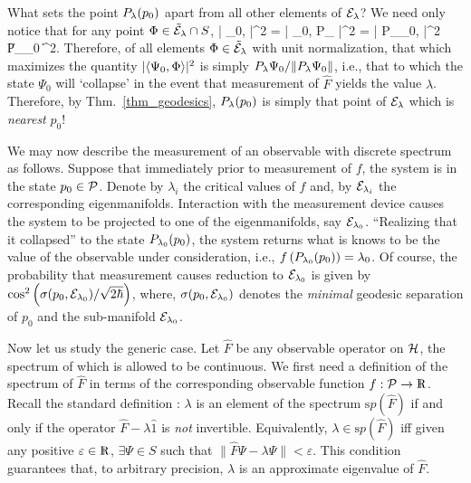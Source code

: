 What sets the point ${\Bbb P}_\lambda(p_0)$ apart from all other
elements of  ${\cal E}_\lambda$?  We need only notice that for any
point  $\Phi \in \tilde{\cal E}_\lambda \cap S$,
%
\be\label{projection-ineq}
\left| \< \Psi_0, \Phi \> \right|^2 =
\left| \< \Psi_0, {\Bbb P}_\lambda \Phi \> \right|^2 =
\left| \< {\Bbb P}_\lambda \Psi_0, \Phi \> \right|^2 \le
\| {\Bbb P}_\lambda \Psi_0 \|^2.
\ee
%
Therefore, of all elements $\Phi \in \tilde{\cal E}_\lambda$ with unit
normalization, that which maximizes the quantity $|\<
\Psi_0,\Phi\>|^2$ is simply ${\Bbb P}_\lambda \Psi_0 / \| {\Bbb
P}_\lambda \Psi_0 \|$, i.e., that to which the state $\Psi_0$ will
`collapse' in the event that measurement of $\hat{F}$ yields the value
$\lambda$.  Therefore, by Thm.~\ref{thm_geodesics}, ${\Bbb
P}_\lambda(p_0)$ is simply that point of ${\cal E}_\lambda$ which is
{\em nearest} $p_0$!

We may now describe the measurement of an observable with discrete
spectrum as follows.  Suppose that immediately prior to measurement of
$f$, the system is in the state $p_0 \in \P$.  Denote by $\lambda_i$
the critical values of $f$ and, by ${\cal E}_{\lambda_i}$ the
corresponding eigenmanifolds.  Interaction with the measurement device
causes the system to be projected to one of the eigenmanifolds, say
${\cal E}_{\lambda_0}$.  ``Realizing that it collapsed'' to the state
${\Bbb P}_{\lambda_0}(p_0)$, the system returns what is knows to be
the value of the observable under consideration, i.e., $f\left( {\Bbb
P}_{\lambda_0}(p_0)\right) = \lambda_0$.  Of course, the probability
that measurement causes reduction to ${\cal E}_{\lambda_0}$ is given
by $\cos^2 \left( \sigma(p_0,{\cal E}_{\lambda_0}) / \sqrt{2\hbar}
\right)$, where, $\sigma(p_0,{\cal E}_{\lambda_0})$ denotes the {\em
minimal} geodesic separation of $p_0$ and the sub-manifold ${\cal
E}_{\lambda_0}$.

Now let us study the generic case.  Let $\hat{F}$ be any observable
operator on $\H$, the spectrum of which is allowed to be continuous.
We first need a definition of the spectrum of $\hat{F}$ in terms of
the corresponding observable function $f:\P\rightarrow\R$.  Recall the
standard definition \cite{reed-simon}: $\lambda$ is an element of the
spectrum ${\mathrm sp}(\hat{F})$ if and only if the operator $\hat{F}
- \lambda\hat{1}$ is {\em not} invertible.  Equivalently, $\lambda \in
{\mathrm sp}(\hat{F})$ iff given any positive $\varepsilon\in\R$,
$\exists \Psi\in S$ such that $\| \hat{F}\Psi - \lambda\Psi \| <
\varepsilon$.  This condition guarantees that, to arbitrary precision,
$\lambda$ is an approximate eigenvalue of $\hat{F}$.

